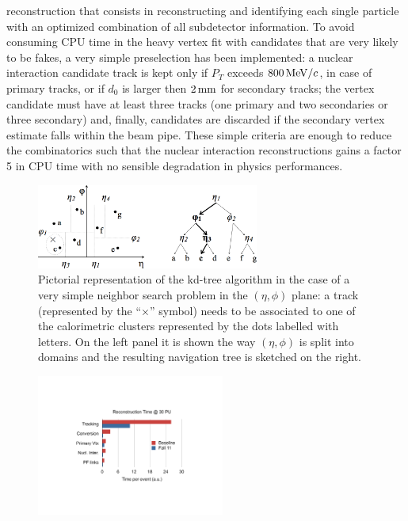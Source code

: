 \begin{description}
  reconstruction that consists in reconstructing and identifying each
  single particle with an optimized combination of all subdetector
  information. To avoid consuming CPU
  time in the heavy vertex fit with candidates that are very likely to
  be fakes, a very simple preselection has been implemented: a nuclear
  interaction candidate track is kept only if $P_T$ exceeds
  $800{\rm \, MeV}/c$, in case of primary tracks, or if $d_0$ is larger then
  $2\rm \, mm$ for secondary tracks; the vertex candidate must have at least
  three tracks (one primary and two secondaries or three secondary)
  and, finally, candidates are discarded if the
  secondary vertex estimate falls within the beam pipe. These simple
  criteria are enough to reduce the combinatorics such that the
  nuclear interaction reconstructions gains a factor 5 in CPU time with
  no sensible degradation in physics performances.
\begin{figure}[t]
\begin{center}
\includegraphics*[width=0.65\textwidth]{figs/kdtree.png}
\caption{Pictorial representation of the kd-tree algorithm in the case
  of a very simple neighbor search problem in the $(\eta, \phi)$
  plane: a track (represented by the ``$\times$'' symbol) needs to be
  associated to one of the calorimetric clusters represented by the
  dots labelled with letters. On the left panel it is shown the way
  $(\eta, \phi)$ is split into domains and the resulting navigation tree is
  sketched on the right.}
\label{fig:kdtree}
\end{center}
\end{figure}
\begin{figure}[b]
\includegraphics*[width=0.55\textwidth]{figs/recotime.pdf}\hspace{0.02\textwidth}%

\end{figure}
\end{description}
